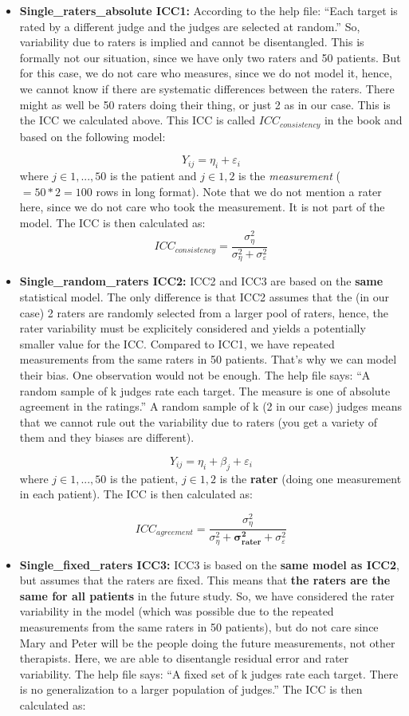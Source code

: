 \documentclass[
]{book}
\begin{document}
\begin{itemize}
\item
  \textbf{Single\_raters\_absolute ICC1:}
  According to the help file: ``Each target is rated by a different
  judge and the judges are selected at random.'' So, variability due to raters
  is implied and cannot be disentangled.
  This is formally not our situation, since we have only two raters and
  50 patients. But for this case, we do not care who measures, since we do not
  model it, hence, we cannot know if there are systematic differences between
  the raters. There might as well be 50 raters doing their thing, or just 2 as in our case.
  This is the ICC we calculated above. This ICC is called \(ICC_{consistency}\)
  in the book and based on the following model:

  \[ Y_{ij} = \eta_i + \varepsilon_i \]
  where \(j \in {1,...,50}\) is the patient and \(j \in {1,2}\) is the \emph{measurement}
  (\(=50*2=100\) rows in long format).
  Note that we do not mention a rater here, since we do not care who took the
  measurement. It is not part of the model. The ICC is then calculated as:
  \[ ICC_{consistency} = \frac{\sigma_{\eta}^2}{\sigma_{\eta}^2 + \sigma_{\varepsilon}^2}\]
\item
  \textbf{Single\_random\_raters ICC2:}
  ICC2 and ICC3 are based on the \textbf{same} statistical model. The only difference is
  that ICC2 assumes that the (in our case) 2 raters are randomly selected from a larger pool of raters,
  hence, the rater variability must be explicitely considered and yields a potentially smaller
  value for the ICC. Compared to ICC1, we have repeated measurements from the same raters
  in 50 patients. That's why we can model their bias. One observation would not be enough.
  The help file says: ``A random sample of k judges rate each target.
  The measure is one of absolute agreement in the ratings.''
  A random sample of k (2 in our case) judges means that we cannot rule out the variability
  due to raters (you get a variety of them and they biases are different).

  \[ Y_{ij} = \eta_i + \beta_j + \varepsilon_i \]
  where \(j \in {1,...,50}\) is the patient, \(j \in {1,2}\) is the \textbf{rater}
  (doing one measurement in each patient). The ICC is then calculated as:

  \[ ICC_{agreement} = \frac{\sigma_{\eta}^2}{\sigma_{\eta}^2 +\mathbf{\sigma_{rater}^2} + 
  \sigma_{\varepsilon}^2}\]
\item
  \textbf{Single\_fixed\_raters ICC3:}
  ICC3 is based on the \textbf{same model as ICC2}, but assumes that the raters are fixed.
  This means that \textbf{the raters are the same for all patients} in the future study.
  So, we have considered the rater variability in the model
  (which was possible due to the repeated measurements from the same raters in 50 patients),
  but do not care since Mary and Peter will be the people doing the future
  measurements, not other therapists. Here, we are able to disentangle residual error
  and rater variability.
  The help file says: ``A fixed set of k judges rate each target.
  There is no generalization to a larger population of judges.''
  The ICC is then calculated as:


\end{itemize}
\end{document}
